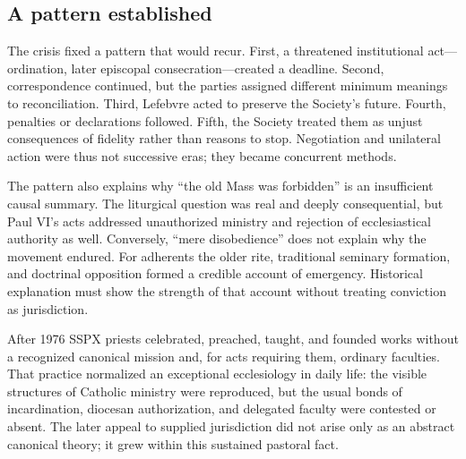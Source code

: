 \subsection{A pattern established}

The crisis fixed a pattern that would recur. First, a threatened institutional act---ordination, later episcopal consecration---created a deadline. Second, correspondence continued, but the parties assigned different minimum meanings to reconciliation. Third, Lefebvre acted to preserve the Society's future. Fourth, penalties or declarations followed. Fifth, the Society treated them as unjust consequences of fidelity rather than reasons to stop. Negotiation and unilateral action were thus not successive eras; they became concurrent methods.

The pattern also explains why ``the old Mass was forbidden'' is an insufficient causal summary. The liturgical question was real and deeply consequential, but Paul VI's acts addressed unauthorized ministry and rejection of ecclesiastical authority as well. Conversely, ``mere disobedience'' does not explain why the movement endured. For adherents the older rite, traditional seminary formation, and doctrinal opposition formed a credible account of emergency. Historical explanation must show the strength of that account without treating conviction as jurisdiction.

After 1976 SSPX priests celebrated, preached, taught, and founded works without a recognized canonical mission and, for acts requiring them, ordinary faculties. That practice normalized an exceptional ecclesiology in daily life: the visible structures of Catholic ministry were reproduced, but the usual bonds of incardination, diocesan authorization, and delegated faculty were contested or absent. The later appeal to supplied jurisdiction did not arise only as an abstract canonical theory; it grew within this sustained pastoral fact.
